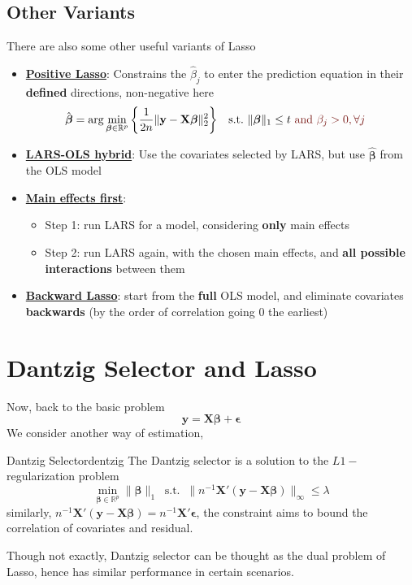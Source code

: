 \documentclass[twoside]{article}
\begin{document}
\subsection{Other Variants}
There are also some other useful variants of Lasso
\begin{itemize}
    \item \textbf{\underline{Positive Lasso}}: Constrains the $\hat{\beta}_j$ to enter the prediction equation in their \textbf{defined} directions, non-negative here 
    \begin{align*}
        \hat{\boldsymbol{\beta}} &= \arg\min_{\boldsymbol{\beta}\in \mathbb{R}^p}\left\{ \frac{1}{2n} \lVert \mathbf{y}-\mathbf{X}\boldsymbol{\beta} \rVert^2_2 \right\} & \text{s.t.\ } & \lVert \boldsymbol{\beta} \rVert _1 \leq t \textcolor{myred}{\text{ and } \beta_j>0, \forall j}
    \end{align*}
    \item \textbf{\underline{LARS-OLS hybrid}}: Use the covariates selected by LARS, but use $\hat{\boldsymbol{\beta}}$ from the OLS model 
    \item \textbf{\underline{Main effects first}}:
    \begin{itemize}
        \item Step 1: run LARS for a model, considering \textbf{only} main effects 
        \item Step 2: run LARS again, with the chosen main effects, and \textbf{all possible interactions} between them
    \end{itemize}
    \item \textbf{\underline{Backward Lasso}}: start from the \textbf{full} OLS model, and eliminate covariates \textbf{backwards} (by the order of correlation going 0 the earliest)
\end{itemize}

\section{Dantzig Selector and Lasso}
Now, back to the basic problem 
$$
\mathbf{y} = \mathbf{X}\boldsymbol{\beta} + \boldsymbol{\epsilon}
$$
We consider another way of estimation, 
\begin{definition}{Dantzig Selector}{dentzig}
    The Dantzig selector is a solution to the $L1-$regularization problem 
    $$
    \min_{\boldsymbol{\beta}\in\mathbb{R}^p}\lVert \boldsymbol{\beta} \rVert _1 \ \text{ s.t. }\ \lVert n^{-1}\mathbf{X}'(\mathbf{y}-\mathbf{X}\boldsymbol{\beta}) \rVert _{\infty} \leq \lambda
    $$
    similarly, $n^{-1}\mathbf{X}'(\mathbf{y}-\mathbf{X}\boldsymbol{\beta}) = n^{-1}\mathbf{X}'\boldsymbol{\epsilon}$, the constraint aims to bound the correlation of covariates and residual. 
\end{definition}
Though not exactly, Dantzig selector can be thought as the dual problem of Lasso, hence has similar performance in certain scenarios. 
\end{document}

